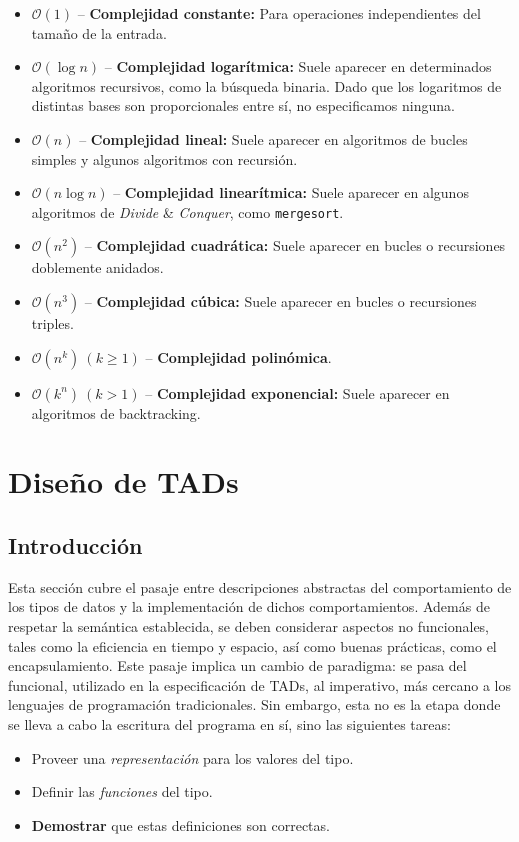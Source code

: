 \documentclass{article}
\newcommand{\BigO}[1]{{\mathcal{O}(#1)}}
\newcommand{\code}{\texttt}
\begin{document}
\begin{itemize}
    \item $\BigO{1}$ -- \textbf{Complejidad constante:} Para operaciones independientes del tamaño de la entrada.
    \item $\BigO{\log{n}}$ -- \textbf{Complejidad logarítmica:} Suele aparecer en determinados algoritmos recursivos, como la búsqueda binaria. Dado que los logaritmos de distintas bases son proporcionales entre sí, no especificamos ninguna.
    \item $\BigO{n}$ -- \textbf{Complejidad lineal:} Suele aparecer en algoritmos de bucles simples y algunos algoritmos con recursión.
    \item $\BigO{n \log{n}}$ -- \textbf{Complejidad linearítmica:} Suele aparecer en algunos algoritmos de \textit{Divide} \& \textit{Conquer}, como \code{mergesort}.
    \item $\BigO{n^2}$ -- \textbf{Complejidad cuadrática:} Suele aparecer en bucles o recursiones doblemente anidados.
    \item $\BigO{n^3}$ -- \textbf{Complejidad cúbica:} Suele aparecer en bucles o recursiones triples.
    \item $\BigO{n^k}\ (k \geq 1)$ -- \textbf{Complejidad polinómica}.
    \item $\BigO{k^n}\ (k > 1)$ -- \textbf{Complejidad exponencial:} Suele aparecer en algoritmos de backtracking.
\end{itemize}

\section{Diseño de TADs}

\subsection{Introducción}

Esta sección cubre el pasaje entre descripciones abstractas del comportamiento de los tipos de datos y la implementación de dichos comportamientos. Además de respetar la semántica establecida, se deben considerar aspectos no funcionales, tales como la eficiencia en tiempo y espacio, así como buenas prácticas, como el encapsulamiento. Este pasaje implica un cambio de paradigma: se pasa del funcional, utilizado en la especificación de TADs, al imperativo, más cercano a los lenguajes de programación tradicionales. Sin embargo, esta no es la etapa donde se lleva a cabo la escritura del programa en sí, sino las siguientes tareas:
\begin{itemize}
    \item Proveer una \textit{representación} para los valores del tipo.
    \item Definir las \textit{funciones} del tipo.
    \item \textbf{Demostrar} que estas definiciones son correctas.
\end{itemize}
\end{document}
